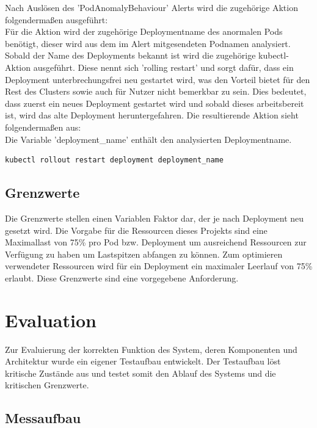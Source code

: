 \documentclass[a4paper,10pt]{scrartcl}
\begin{document}
Nach Auslösen des 'PodAnomalyBehaviour' Alerts wird die zugehörige Aktion folgendermaßen ausgeführt:\\

Für die Aktion wird der zugehörige Deploymentname des anormalen Pods benötigt, dieser wird aus dem im Alert mitgesendeten Podnamen analysiert. Sobald der Name des Deployments bekannt ist wird die zugehörige kubectl-Aktion ausgeführt. Diese nennt sich 'rolling restart' und sorgt dafür, dass ein Deployment unterbrechungsfrei neu gestartet wird, was den Vorteil bietet für den Rest des Clusters sowie auch für Nutzer nicht bemerkbar zu sein. Dies bedeutet, dass zuerst ein neues Deployment gestartet wird und sobald dieses arbeitsbereit ist, wird das alte Deployment heruntergefahren. Die resultierende Aktion sieht folgendermaßen aus:\\
Die Variable 'deployment\_name' enthält den analysierten Deploymentname.
\begin{lstlisting}
kubectl rollout restart deployment deployment_name
\end{lstlisting}

\subsection{Grenzwerte}

Die Grenzwerte stellen einen Variablen Faktor dar, der je nach Deployment neu gesetzt wird. Die Vorgabe für die Ressourcen dieses Projekts sind eine Maximallast von 75\% pro Pod bzw. Deployment um ausreichend Ressourcen zur Verfügung zu haben um Lastspitzen abfangen zu können. Zum optimieren verwendeter Ressourcen wird für ein Deployment ein maximaler Leerlauf von 75\% erlaubt. Diese Grenzwerte sind eine vorgegebene Anforderung.

\pagebreak
\section{Evaluation}

Zur Evaluierung der korrekten Funktion des System, deren Komponenten und Architektur wurde ein eigener Testaufbau entwickelt. Der Testaufbau löst kritische Zustände aus und testet somit den Ablauf des Systems und die kritischen Grenzwerte.

\subsection{Messaufbau}
\end{document}
